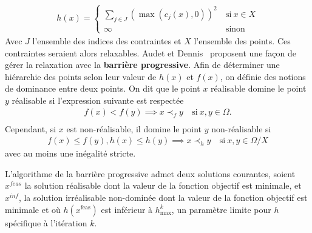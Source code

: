 \begin{align*}
h(x) = \begin{cases}
\sum_{j\in J}^{}(\max(c_j(x),0))^2~ &\text{si}~x\in X\\
\infty~ &\text{sinon}
\end{cases}
\end{align*}
Avec $J$ l'ensemble des indices des contraintes et $X$ l'ensemble des points. Ces contraintes seraient alors relaxables. Audet et Dennis~\cite{AuDe09a} proposent une façon de gérer la relaxation avec la \textbf{barrière progressive}. Afin de déterminer une hiérarchie des points selon leur valeur de $h(x)$ et $f(x)$, on définie des notions de dominance entre deux points. On dit que le point $x$ réalisable domine le point $y$ réalisable si l'expression suivante est respectée 
\begin{align*}
f(x) < f(y) \implies x\prec_{f} y ~ &\text{si}~x,y\in\Omega.\\
\end{align*}
Cependant, si $x$ est non-réalisable, il domine le point $y$ non-réalisable si
\begin{align*}
f(x) \leq f(y), h(x)\leq h(y) \implies x\prec_{h} y ~ &\text{si}~x,y\in\Omega/X
\end{align*}
avec au moins une inégalité stricte.

L'algorithme de la barrière progressive admet deux solutions courantes, soient $x^{feas}$ la solution réalisable dont la valeur de la fonction objectif est minimale, et $x^{inf}$, la solution irréalisable non-dominée dont la valeur de la fonction objectif est minimale et où $h(x^\text{feas})$ est inférieur à $h^k_{\max}$, un paramètre limite pour $h$ spécifique à l'itération $k$.

